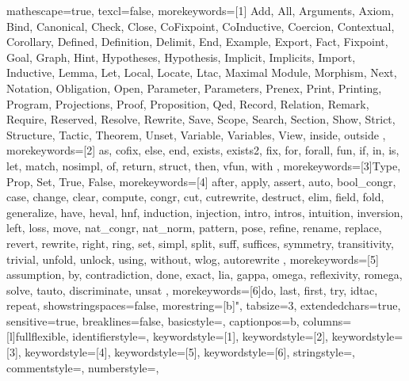 
 {
mathescape=true,						
texcl=false,
morekeywords=[1]{
  Add,
  All,
  Arguments,
  Axiom,
  Bind,
  Canonical,
  Check,
  Close,
  CoFixpoint,
  CoInductive,
  Coercion,
  Contextual,
  Corollary,
  Defined,
  Definition,
  Delimit,
  End,
  Example,
  Export,
  Fact,
  Fixpoint,
  Goal,
  Graph,
  Hint,
  Hypotheses,
  Hypothesis,
  Implicit,
  Implicits,
  Import,
  Inductive,
  Lemma,
  Let,
  Local,
  Locate,
  Ltac,
  Maximal
  Module,
  Morphism,
  Next,
  Notation,
  Obligation,
  Open,
  Parameter,
  Parameters,
  Prenex,
  Print,
  Printing,
  Program,
  Projections,
  Proof,
  Proposition,
  Qed,
  Record,
  Relation,
  Remark,
  Require,
  Reserved,
  Resolve,
  Rewrite,
  Save,
  Scope,
  Search,
  Section,
  Show,
  Strict,
  Structure,
  Tactic,
  Theorem,
  Unset,
  Variable,
  Variables,
  View,
  inside,
  outside
},
morekeywords=[2]{
  as,
  cofix,
  else,
  end,
  exists,
  exists2,
  fix,
  for,
  forall,
  fun,
  if,
  in,
  is,
  let,
  match,
  nosimpl,
  of,
  return,
  struct,
  then,
  vfun,
  with
},
morekeywords=[3]{Type, Prop, Set, True, False},
morekeywords=[4]{
  after,
  apply,
  assert,
  auto,
  bool_congr,
  case,
  change,
  clear,
  compute,
  congr,
  cut,
  cutrewrite,
  destruct,
  elim,
  field,
  fold,
  generalize,
  have,
  heval, 
  hnf,
  induction,
  injection,
  intro,
  intros,
  intuition,
  inversion,
  left,
  loss,
  move,
  nat_congr,
  nat_norm,
  pattern,
  pose,
  refine,
  rename,
  replace,
  revert,
  rewrite,
  right,
  ring,
  set,
  simpl,
  split,
  suff,
  suffices,
  symmetry,
  transitivity,
  trivial,
  unfold,
  unlock,
  using,
  without,
  wlog,
  autorewrite
},        
morekeywords=[5]{
  assumption,
  by,
  contradiction,
  done,
  exact,
  lia,
  gappa,
  omega,
  reflexivity,
  romega,
  solve,
  tauto,
  discriminate,
  unsat
},
morekeywords=[6]{do, last, first, try, idtac, repeat},
showstringspaces=false,
morestring=[b]",
tabsize=3,							
extendedchars=true,  		 		
sensitive=true, 
breaklines=false,
basicstyle=\small\ttfamily,
captionpos=b,							
columns=[l]fullflexible,
identifierstyle={\color{black}},
keywordstyle=[1]{\color{violet}},
keywordstyle=[2]{\color{forestgreen}},
keywordstyle=[3]{\color{forestgreen}},
keywordstyle=[4]{\color{blue}},
keywordstyle=[5]{\color{red}},
keywordstyle=[6]{\color{violet}},
stringstyle=,
commentstyle=,
numberstyle=\tiny,
}

